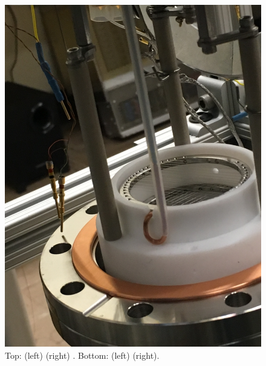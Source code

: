 \begin{figure}[htbp]
\begin{minipage}{0.47\textwidth}
    \includegraphics[width=\linewidth]{figures/testbed/ft5_4.jpg}
    \end{minipage}
\caption{Top: (left) (right) . Bottom: (left) (right).}
 \label{fig:ssrodft}
\end{figure}



